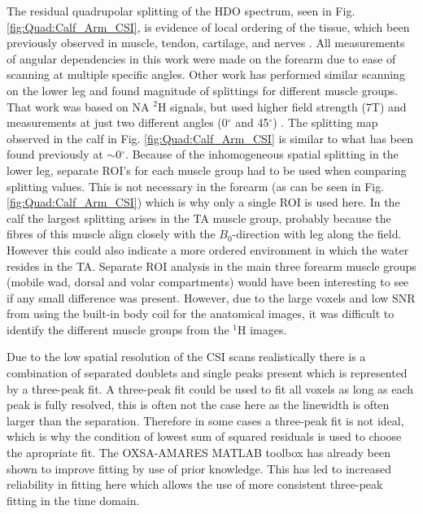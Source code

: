 The residual quadrupolar splitting of the \ac{HDO} spectrum, seen in Fig. \ref{fig:Quad:Calf_Arm_CSI}, is evidence of local ordering of the tissue, which been previously observed in muscle, tendon, cartilage, and nerves \cite{Gursan2022ResidualMuscle,Sharf1995DetectionNMR-Spectroscopy,Perea20072HDisc,Eliav2016MultipleMRS}. All measurements of angular dependencies in this work were made on the forearm due to ease of scanning at multiple specific angles. Other work has performed similar scanning on the lower leg and found magnitude of splittings for different muscle groups. That work was based on \ac{NA} $^2$H signals, but used higher field strength (7T) and measurements at just two different angles (0$^\circ$ and 45$^\circ$) \cite{Gursan2022ResidualMuscle}. The splitting map observed in the calf in Fig. \ref{fig:Quad:Calf_Arm_CSI} is similar to what has been found previously at $\sim$0$^\circ$. Because of the inhomogeneous spatial splitting in the lower leg, separate \ac{ROI}'s for each muscle group had to be used when comparing splitting values. This is not necessary in the forearm (as can be seen in Fig. \ref{fig:Quad:Calf_Arm_CSI}) which is why only a single  ROI is used here. In the calf the largest splitting arises in the \ac{TA} muscle group, probably because the fibres of this muscle align closely \cite{Gursan2022ResidualMuscle} with the $B_0$-direction with leg along the field. However this could also indicate a more ordered environment in which the water resides in the \ac{TA}. Separate \ac{ROI} analysis in the main three forearm muscle groups (mobile wad, dorsal and volar compartments) would have been interesting to see if any small difference was present. However, due to the large voxels and low \ac{SNR} from using the built-in body coil for the anatomical images, it was difficult to identify the different muscle groups from the $^1$H images.


Due to the low spatial resolution of the \ac{CSI} scans realistically there is a combination of separated doublets and single peaks present which is represented by a three-peak fit. A three-peak fit could be used to fit all voxels as long as each peak is fully resolved, this is often not the case here as the linewidth is often larger than the separation. Therefore in some cases a three-peak fit is not ideal, which is why the condition of lowest sum of squared residuals is used to choose the apropriate fit. The OXSA-AMARES MATLAB toolbox has already been shown to improve fitting by use of prior knowledge. This has led to increased reliability in fitting here which allows the use of more consistent three-peak fitting in the time domain. 

